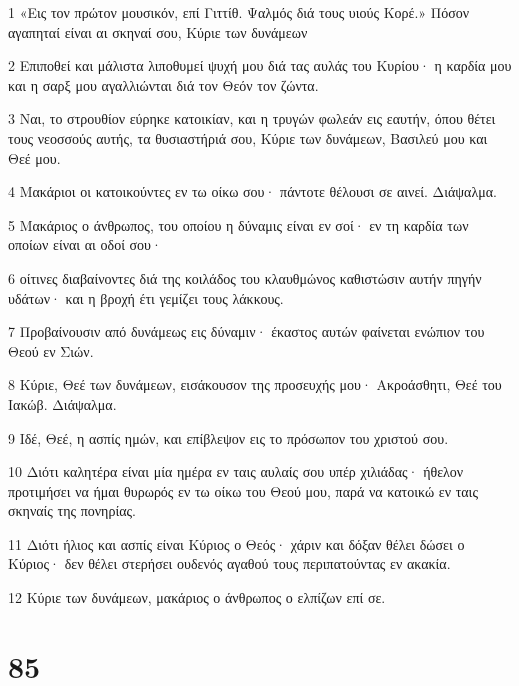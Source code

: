 \par 1 «Εις τον πρώτον μουσικόν, επί Γιττίθ. Ψαλμός διά τους υιούς Κορέ.» Πόσον αγαπηταί είναι αι σκηναί σου, Κύριε των δυνάμεων
\par 2 Επιποθεί και μάλιστα λιποθυμεί ψυχή μου διά τας αυλάς του Κυρίου· η καρδία μου και η σαρξ μου αγαλλιώνται διά τον Θεόν τον ζώντα.
\par 3 Ναι, το στρουθίον εύρηκε κατοικίαν, και η τρυγών φωλεάν εις εαυτήν, όπου θέτει τους νεοσσούς αυτής, τα θυσιαστήριά σου, Κύριε των δυνάμεων, Βασιλεύ μου και Θεέ μου.
\par 4 Μακάριοι οι κατοικούντες εν τω οίκω σου· πάντοτε θέλουσι σε αινεί. Διάψαλμα.
\par 5 Μακάριος ο άνθρωπος, του οποίου η δύναμις είναι εν σοί· εν τη καρδία των οποίων είναι αι οδοί σου·
\par 6 οίτινες διαβαίνοντες διά της κοιλάδος του κλαυθμώνος καθιστώσιν αυτήν πηγήν υδάτων· και η βροχή έτι γεμίζει τους λάκκους.
\par 7 Προβαίνουσιν από δυνάμεως εις δύναμιν· έκαστος αυτών φαίνεται ενώπιον του Θεού εν Σιών.
\par 8 Κύριε, Θεέ των δυνάμεων, εισάκουσον της προσευχής μου· Ακροάσθητι, Θεέ του Ιακώβ. Διάψαλμα.
\par 9 Ιδέ, Θεέ, η ασπίς ημών, και επίβλεψον εις το πρόσωπον του χριστού σου.
\par 10 Διότι καλητέρα είναι μία ημέρα εν ταις αυλαίς σου υπέρ χιλιάδας· ήθελον προτιμήσει να ήμαι θυρωρός εν τω οίκω του Θεού μου, παρά να κατοικώ εν ταις σκηναίς της πονηρίας.
\par 11 Διότι ήλιος και ασπίς είναι Κύριος ο Θεός· χάριν και δόξαν θέλει δώσει ο Κύριος· δεν θέλει στερήσει ουδενός αγαθού τους περιπατούντας εν ακακία.
\par 12 Κύριε των δυνάμεων, μακάριος ο άνθρωπος ο ελπίζων επί σε.

\chapter{85}

